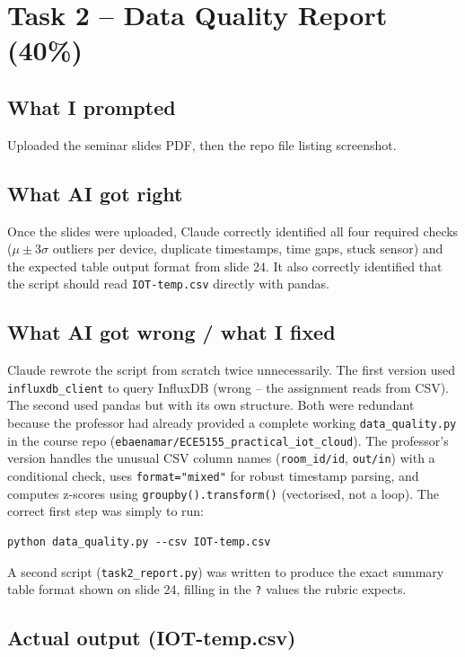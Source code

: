 \documentclass[11pt, letterpaper]{article}
\begin{document}
\section{Task 2 -- Data Quality Report (40\%)}

\subsection{What I prompted}
Uploaded the seminar slides PDF, then the repo
file listing screenshot.

\subsection{What AI got right}
Once the slides were uploaded, Claude correctly identified all four required checks
($\mu \pm 3\sigma$ outliers per device, duplicate timestamps, time gaps, stuck sensor)
and the expected table output format from slide 24. It also correctly identified that
the script should read \texttt{IOT-temp.csv} directly with pandas.

\subsection{What AI got wrong / what I fixed}
Claude rewrote the script from scratch twice unnecessarily. The first version used
\texttt{influxdb\_client} to query InfluxDB (wrong -- the assignment reads from CSV).
The second used pandas but with its own structure. Both were redundant because the
professor had already provided a complete working \texttt{data\_quality.py} in the
course repo (\texttt{ebaenamar/ECE5155\_practical\_iot\_cloud}). The professor's
version handles the unusual CSV column names (\texttt{room\_id/id}, \texttt{out/in})
with a conditional check, uses \texttt{format="mixed"} for robust timestamp parsing,
and computes z-scores using \texttt{groupby().transform()} (vectorised, not a loop).
The correct first step was simply to run:

\begin{lstlisting}
python data_quality.py --csv IOT-temp.csv
\end{lstlisting}

A second script (\texttt{task2\_report.py}) was written to produce the exact summary
table format shown on slide 24, filling in the \texttt{?} values the rubric expects.

\subsection{Actual output (IOT-temp.csv)}
\end{document}
